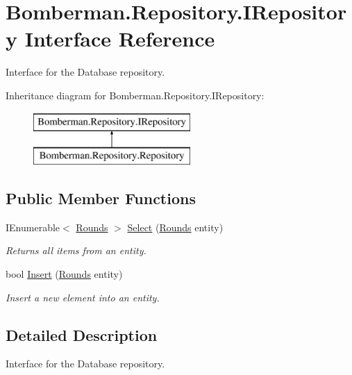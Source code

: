 \hypertarget{interface_bomberman_1_1_repository_1_1_i_repository}{}\section{Bomberman.\+Repository.\+I\+Repository Interface Reference}
\label{interface_bomberman_1_1_repository_1_1_i_repository}


Interface for the Database repository.  


Inheritance diagram for Bomberman.\+Repository.\+I\+Repository\+:\begin{figure}[H]
\begin{center}
\leavevmode
\includegraphics[height=2.000000cm]{interface_bomberman_1_1_repository_1_1_i_repository}
\end{center}
\end{figure}
\subsection*{Public Member Functions}
\begin{DoxyCompactItemize}
\item 
I\+Enumerable$<$ \mbox{\hyperlink{class_bomberman_1_1_data_1_1_rounds}{Rounds}} $>$ \mbox{\hyperlink{interface_bomberman_1_1_repository_1_1_i_repository_a5d04a798b7326f2c05f77a29dd0de285}{Select}} (\mbox{\hyperlink{class_bomberman_1_1_data_1_1_rounds}{Rounds}} entity)
\begin{DoxyCompactList}\small\item\em Returns all items from an entity. \end{DoxyCompactList}\item 
bool \mbox{\hyperlink{interface_bomberman_1_1_repository_1_1_i_repository_ab117e28c62bf81dee5e699cd9e376588}{Insert}} (\mbox{\hyperlink{class_bomberman_1_1_data_1_1_rounds}{Rounds}} entity)
\begin{DoxyCompactList}\small\item\em Insert a new element into an entity. \end{DoxyCompactList}\end{DoxyCompactItemize}


\subsection{Detailed Description}
Interface for the Database repository. 



